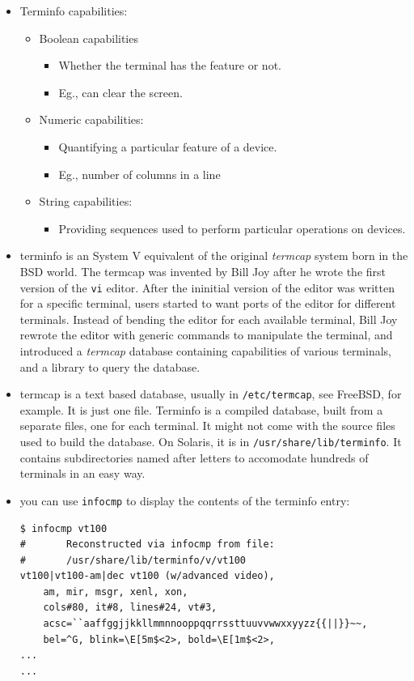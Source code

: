 \begin{itemize}
\item Terminfo capabilities:
	\begin{itemize}
	\item Boolean capabilities
		\begin{itemize}
		\item Whether the terminal has the feature or not.
		\item Eg., can clear the screen.
		\end{itemize}
	\item Numeric capabilities:
		\begin{itemize}
		\item Quantifying a particular feature of a device.
		\item Eg., number of columns in a line
		\end{itemize}
	\item String capabilities:
		\begin{itemize}
		\item Providing sequences used to perform particular operations
		on devices.
		\end{itemize}
	\end{itemize}
\item terminfo is an System V equivalent of the original \emph{termcap} system
born in the BSD world. The termcap was invented by Bill Joy after he wrote the
first version of the \texttt{vi} editor. After the ininitial version of the
editor was written for a specific terminal, users started to want ports of the
editor for different terminals. Instead of bending the editor for each
available terminal, Bill Joy rewrote the editor with generic commands to
manipulate the terminal, and introduced a \emph{termcap} database containing
capabilities of various terminals, and a library to query the database.
\item termcap is a text based database, usually in \texttt{/etc/termcap}, see
FreeBSD, for example. It is just one file. Terminfo is a compiled database,
built from a separate files, one for each terminal. It might not come with the
source files used to build the database. On Solaris, it is in
\texttt{/usr/share/lib/terminfo}. It contains subdirectories named after letters
to accomodate hundreds of terminals in an easy way.
\item you can use \texttt{infocmp} to display the contents of the terminfo
entry:

\begin{verbatim}
$ infocmp vt100
#       Reconstructed via infocmp from file:
#       /usr/share/lib/terminfo/v/vt100
vt100|vt100-am|dec vt100 (w/advanced video),
    am, mir, msgr, xenl, xon,
    cols#80, it#8, lines#24, vt#3,
    acsc=``aaffggjjkkllmmnnooppqqrrssttuuvvwwxxyyzz{{||}}~~,
    bel=^G, blink=\E[5m$<2>, bold=\E[1m$<2>,
...
...
\end{verbatim}


\end{itemize}
